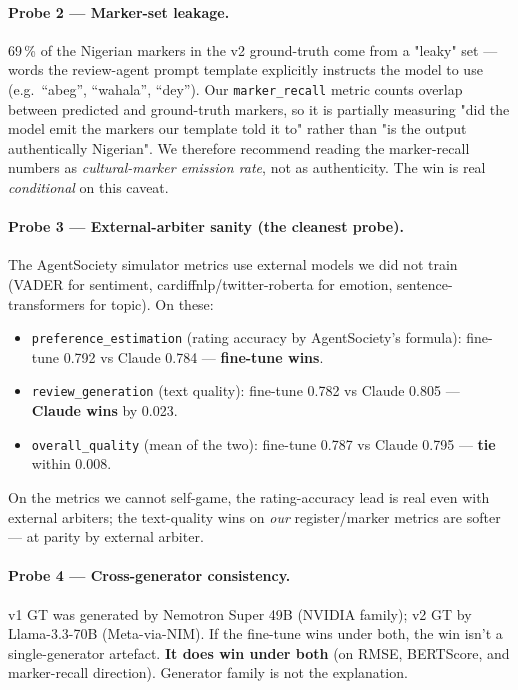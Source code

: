 \documentclass[sigconf,nonacm,balance]{acmart}
\begin{document}
\paragraph{Probe 2 — Marker-set leakage.} 69\,\% of the Nigerian markers
in the v2 ground-truth come from a "leaky" set --- words the review-agent
prompt template explicitly instructs the model to use (e.g.\ ``abeg'',
``wahala'', ``dey''). Our \texttt{marker\_recall} metric counts overlap
between predicted and ground-truth markers, so it is partially measuring
"did the model emit the markers our template told it to" rather than
"is the output authentically Nigerian". We therefore recommend reading
the marker-recall numbers as \emph{cultural-marker emission rate}, not
as authenticity. The win is real \emph{conditional} on this caveat.

\paragraph{Probe 3 — External-arbiter sanity (the cleanest probe).}
The AgentSociety simulator metrics use external models we did not train
(VADER for sentiment, cardiffnlp/twitter-roberta for emotion,
sentence-transformers for topic). On these:
\begin{itemize}[leftmargin=*]
    \item \texttt{preference\_estimation} (rating accuracy by AgentSociety's
          formula): fine-tune 0.792 vs Claude 0.784 --- \textbf{fine-tune wins}.
    \item \texttt{review\_generation} (text quality):
          fine-tune 0.782 vs Claude 0.805 --- \textbf{Claude wins} by 0.023.
    \item \texttt{overall\_quality} (mean of the two):
          fine-tune 0.787 vs Claude 0.795 --- \textbf{tie} within 0.008.
\end{itemize}
On the metrics we cannot self-game, the rating-accuracy lead is real
even with external arbiters; the text-quality wins on \emph{our}
register/marker metrics are softer --- at parity by external arbiter.

\paragraph{Probe 4 — Cross-generator consistency.} v1 GT was generated by
Nemotron Super 49B (NVIDIA family); v2 GT by Llama-3.3-70B
(Meta-via-NIM). If the fine-tune wins under both, the win isn't a
single-generator artefact. \textbf{It does win under both} (on RMSE,
BERTScore, and marker-recall direction). Generator family is not
the explanation.
\end{document}
